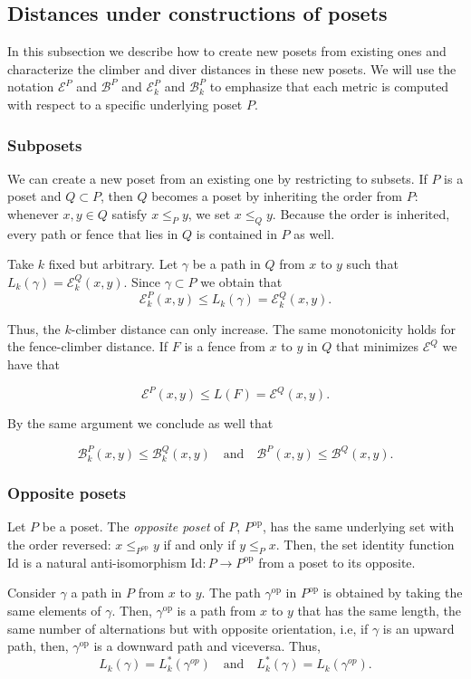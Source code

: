\documentclass{article}[12pt]
\theoremstyle{exampstyle}
\theoremstyle{remark}
\newcommand{\B}{\mathcal{B}}
\newcommand{\E}{\mathcal{E}}
\newcommand{\op}{\text{op}}
\begin{document}
\subsection{Distances under constructions of posets}

In this subsection we describe how to create new posets from existing ones and characterize the climber and diver distances in these new posets. We will use the notation $\E^P$ and $\B^P$ and $\E_k^P$ and $\B_k^P$ to emphasize that each metric is computed with respect to a specific underlying poset $P$. 

\subsubsection*{Subposets}

We can create a new poset from an existing one by restricting to subsets. If $P$ is a poset and $Q \subset P$, then $Q$ becomes a poset by inheriting the order from $P$: whenever $x,y \in Q $ satisfy $x \leq_P y$, we set $x \leq_Q y$. Because the order is inherited, every path or fence that lies in $Q$ is contained in $P$ as well. 

Take $k$ fixed but arbitrary. Let $\gamma$ be a path in $Q$ from $x$ to $y$ such that $L_k(\gamma) = \E^Q_k(x,y)$. Since $\gamma \subset P$ we obtain that
\[ \E^P_k(x,y) \leq L_k(\gamma) = \E^Q_k(x,y). \]

Thus, the $k$-climber distance can only increase. The same monotonicity holds for the fence-climber distance. If $F$ is a fence from $x$ to $y$ in $Q$ that minimizes $\E^Q$ we have that 

\[ \E^P(x,y) \leq L(F) = \E^Q(x,y). \]

By the same argument we conclude as well that 

\[ \B^P_k(x,y) \leq \B^Q_k(x,y)  \quad \text{and} \quad \B^P(x,y) \leq \B^Q(x,y).\]

\subsubsection*{Opposite posets}

Let $P$ be a poset. The \textit{opposite poset} of $P$, $P^{\op}$, has the same underlying set with the order reversed: $x \leq_{P^{\op}} y$ if and only if $y \leq_P x$. Then, the set identity function $\text{Id}$ is a natural anti-isomorphism $\text{Id}: P \to P^{\op}$ from a poset to its opposite. 

Consider $\gamma$ a path in $P$ from $x$ to $y$. The path $\gamma^{\op}$ in $P^{\op}$ is obtained by taking the same elements of $\gamma$. Then, $\gamma^{\op}$ is a path from $x$ to $y$ that has the same length, the same number of alternations but with opposite orientation, i.e, if $\gamma$ is an upward path, then, $\gamma^{\op}$ is a downward path and viceversa. Thus, 
\[
L_k(\gamma) =  L^*_k(\gamma^{op}) \quad \text{and} \quad L^*_k(\gamma) =  L_k(\gamma^{op}).
\]
\end{document}
